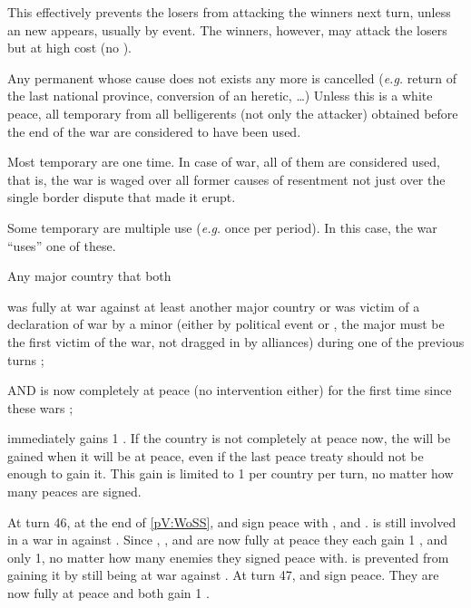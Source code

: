 \begin{designnote}
  This effectively prevents the losers from attacking the winners next turn,
  unless an new \CB appears, usually by event. The winners, however, may
  attack the losers but at high cost (no \CB).
\end{designnote}

\bparag Any permanent \CB whose cause does not exists any more is cancelled
(\emph{e.g.} return of the last national province, conversion of an heretic,
\ldots)
\bparag Unless this is a white peace, all temporary \CB from all belligerents
(not only the attacker) obtained before the end of the war are considered to
have been used.

\begin{designnote}[Temporary \CB]
  Most temporary \CB are one time. In case of war, all of them are considered
  used, that is, the war is waged over all former causes of resentment not
  just over the single border dispute that made it erupt.

  Some temporary \CB are multiple use (\emph{e.g.} once per period). In this
  case, the war ``uses'' one of these.
\end{designnote}

\label{chPeace:Peace and Stability}
Any major country that both
\begin{modlist}
\item was fully at war against at least another major country or was victim of
  a declaration of war by a minor (either by political event or \RD, the major
  must be the first victim of the war, not dragged in by alliances) during one
  of the previous turns ;
\item[AND] is now completely at peace (no intervention either) for the first
  time since these wars ;
\end{modlist}
immediately gains 1 \STAB.
\bparag If the country is not completely at peace now, the \STAB will be
gained when it will be at peace, even if the last peace treaty should not be
enough to gain it.
\bparag This gain is limited to 1 \STAB per country per turn, no matter how
many peaces are signed.

\begin{exemple}
  At turn 46, at the end of \ref{pV:WoSS}, \FRA and \HIS sign peace with \ANG,
  \HOL and \AUS. \AUS is still involved in a war in \paysHongrie against
  \TUR. Since \FRA, \HIS, \ANG and \HOL are now fully at peace they each gain
  1 \STAB, and only 1, no matter how many enemies they signed peace with. \AUS
  is prevented from gaining it by still being at war against \TUR. At turn 47,
  \AUS and \TUR sign peace. They are now fully at peace and both gain 1 \STAB.
\end{exemple}

